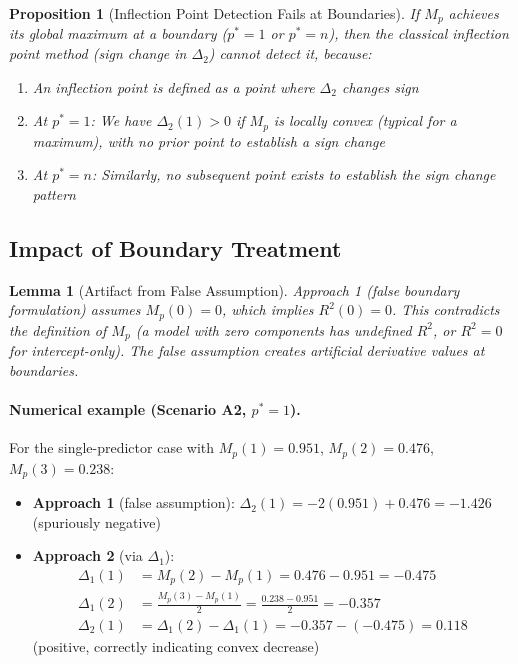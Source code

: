 \documentclass[11pt,a4paper]{article}
\newtheorem{proposition}{Proposition}
\newtheorem{lemma}{Lemma}
\begin{document}
\begin{proposition}[Inflection Point Detection Fails at Boundaries]
\label{prop:boundary}
If $M_p$ achieves its global maximum at a boundary ($p^* = 1$ or $p^* = n$), then the classical inflection point method (sign change in $\Delta_2$) cannot detect it, because:
\begin{enumerate}
\item An inflection point is defined as a point where $\Delta_2$ changes sign
\item At $p^* = 1$: We have $\Delta_2(1) > 0$ if $M_p$ is locally convex (typical for a maximum), with no prior point to establish a sign change
\item At $p^* = n$: Similarly, no subsequent point exists to establish the sign change pattern
\end{enumerate}
\end{proposition}



\subsection{Impact of Boundary Treatment}

\begin{lemma}[Artifact from False Assumption]
\label{lem:artifact}
Approach 1 (false boundary formulation) assumes $M_p(0) = 0$, which implies $R^2(0) = 0$. This contradicts the definition of $M_p$ (a model with zero components has undefined $R^2$, or $R^2 = 0$ for intercept-only). The false assumption creates artificial derivative values at boundaries.
\end{lemma}

\paragraph{Numerical example (Scenario A2, $p^* = 1$).}
For the single-predictor case with $M_p(1) = 0.951$, $M_p(2) = 0.476$, $M_p(3) = 0.238$:

\begin{itemize}
\item \textbf{Approach 1} (false assumption): $\Delta_2(1) = -2(0.951) + 0.476 = -1.426$ (spuriously negative)
\item \textbf{Approach 2} (via $\Delta_1$): 
  \begin{align*}
  \Delta_1(1) &= M_p(2) - M_p(1) = 0.476 - 0.951 = -0.475 \\
  \Delta_1(2) &= \frac{M_p(3) - M_p(1)}{2} = \frac{0.238 - 0.951}{2} = -0.357 \\
  \Delta_2(1) &= \Delta_1(2) - \Delta_1(1) = -0.357 - (-0.475) = 0.118
  \end{align*}
  (positive, correctly indicating convex decrease)
\end{itemize}
\end{document}
